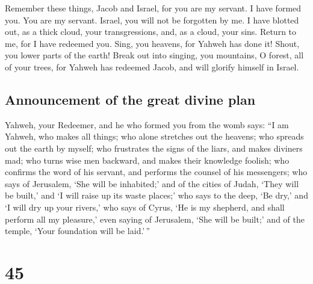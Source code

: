  Remember these things, Jacob and Israel, for you are my
servant. I have formed you. You are my servant. Israel, you will not be
forgotten by me.  I have blotted out, as a thick cloud,
your transgressions, and, as a cloud, your sins. Return to me, for I
have redeemed you.  Sing, you heavens, for Yahweh has
done it! Shout, you lower parts of the earth! Break out into singing,
you mountains, O forest, all of your trees, for Yahweh has redeemed
Jacob, and will glorify himself in Israel.

\hypertarget{announcement-of-the-great-divine-plan}{%
\subsection{Announcement of the great divine
plan}\label{announcement-of-the-great-divine-plan}}

 Yahweh, your Redeemer, and he who formed you from the
womb says: ``I am Yahweh, who makes all things; who alone stretches out
the heavens; who spreads out the earth by myself;  who
frustrates the signs of the liars, and makes diviners mad; who turns
wise men backward, and makes their knowledge foolish; 
who confirms the word of his servant, and performs the counsel of his
messengers; who says of Jerusalem, `She will be inhabited;' and of the
cities of Judah, `They will be built,' and `I will raise up its waste
places;'  who says to the deep, `Be dry,' and `I will dry
up your rivers,'  who says of Cyrus, `He is my shepherd,
and shall perform all my pleasure,' even saying of Jerusalem, `She will
be built;' and of the temple, `Your foundation will be laid.'\,''

\hypertarget{section-44}{%
\section{45}\label{section-44}}

